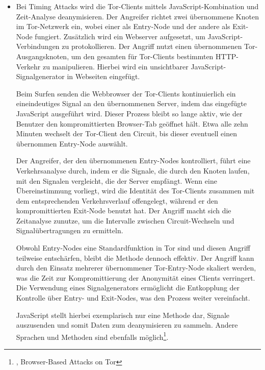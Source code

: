 \begin{itemize}
    \item Bei Timing Attacks wird die Tor-Clients mittels JavaScript-Kombination und Zeit-Analyse deanymisieren. Der Angreifer richtet zwei übernommene Knoten im Tor-Netzwerk ein, wobei einer als Entry-Node und der andere als Exit-Node fungiert. Zusätzlich wird ein Webserver aufgesetzt, um JavaScript-Verbindungen zu protokollieren. Der Angriff nutzt einen übernommenen Tor-Ausgangsknoten, um den gesamten für Tor-Clients bestimmten HTTP-Verkehr zu manipulieren. Hierbei wird ein unsichtbarer JavaScript-Signalgenerator in Webseiten eingefügt.

    Beim Surfen senden die Webbrowser der Tor-Clients kontinuierlich ein eineindeutiges Signal an den übernommenen Server, indem das eingefügte JavaScript ausgeführt wird. Dieser Prozess bleibt so lange aktiv, wie der Benutzer den kompromittierten Browser-Tab geöffnet hält. Etwa alle zehn Minuten wechselt der Tor-Client den Circuit, bis dieser eventuell einen übernommen Entry-Node auswählt.

    Der Angreifer, der den übernommenen Entry-Nodes kontrolliert, führt eine Verkehrsanalyse durch, indem er die Signale, die durch den Knoten laufen, mit den Signalen vergleicht, die der Server empfängt. Wenn eine Übereinstimmung vorliegt, wird die Identität des Tor-Clients zusammen mit dem entsprechenden Verkehrsverlauf offengelegt, während er den kompromittierten Exit-Node benutzt hat. Der Angriff macht sich die Zeitanalyse zunutze, um die Intervalle zwischen Circuit-Wechseln und Signalübertragungen zu ermitteln.

    Obwohl Entry-Nodes eine Standardfunktion in Tor sind und diesen Angriff teilweise entschärfen, bleibt die Methode dennoch effektiv. Der Angriff kann durch den Einsatz mehrerer übernommener Tor-Entry-Node skaliert werden, was die Zeit zur Kompromittierung der Anonymität eines Clients verringert. Die Verwendung eines Signalgenerators ermöglicht die Entkopplung der Kontrolle über Entry- und Exit-Nodes, was den Prozess weiter vereinfacht.

    JavaScript stellt hierbei exemplarisch nur eine Methode dar, Signale auszusenden und somit Daten zum deanymisieren zu sammeln. Andere Sprachen und Methoden sind ebenfalls möglich\footnote{\cite{BrowserBasedAttacksOnTor}, Browser-Based Attacks on Tor}.
\end{itemize}
